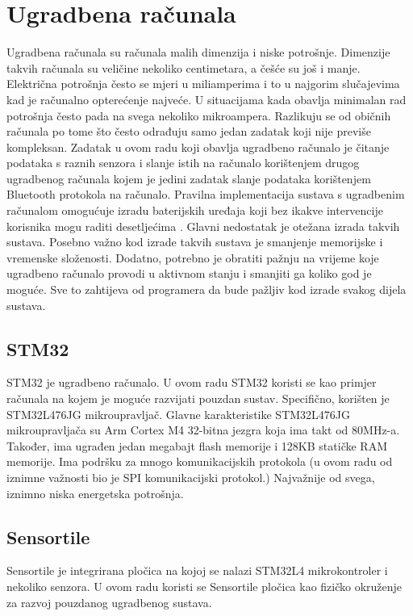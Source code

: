 \documentclass[times, utf8, diplomski]{diplomski}
\begin{document}
\chapter{Ugradbena računala}
Ugradbena računala su računala malih dimenzija i niske potrošnje. Dimenzije takvih računala su veličine nekoliko centimetara, a češće su još i manje.
Električna potrošnja često se mjeri u miliamperima i to u najgorim slučajevima kad je računalno opterećenje najveće.
U situacijama kada obavlja minimalan rad potrošnja često pada na svega nekoliko mikroampera.
Razlikuju se od običnih računala po tome što često odrađuju samo jedan zadatak koji nije previše kompleksan.
Zadatak u ovom radu koji obavlja ugradbeno računalo je čitanje podataka s raznih senzora i slanje istih na računalo korištenjem drugog ugradbenog
računala kojem je jedini zadatak slanje podataka korištenjem Bluetooth protokola na računalo.
Pravilna implementacija sustava s ugradbenim računalom omogućuje izradu baterijskih uređaja koji bez ikakve intervencije korisnika mogu raditi desetljećima \cite{holosys}. 
Glavni nedostatak je otežana izrada takvih sustava. Posebno važno kod izrade takvih sustava je smanjenje memorijske i vremenske složenosti.
Dodatno, potrebno je obratiti pažnju na vrijeme koje ugradbeno računalo provodi u aktivnom stanju i smanjiti ga koliko god je moguće.
Sve to zahtijeva od programera da bude pažljiv kod izrade svakog dijela sustava.


\section{STM32}
STM32 \cite{STM32L476JG} je ugradbeno računalo. U ovom radu STM32 koristi se kao primjer računala na kojem je moguće razvijati pouzdan sustav.
Specifično, korišten je STM32L476JG mikroupravljač.
Glavne karakteristike STM32L476JG mikroupravljača su Arm Cortex M4 32-bitna jezgra koja ima takt od 80MHz-a.
Također, ima ugrađen jedan megabajt flash memorije i 128KB statičke RAM memorije.
Ima podršku za mnogo komunikacijskih protokola (u ovom radu od iznimne važnosti bio je SPI komunikacijski protokol.)
Najvažnije od svega, iznimno niska energetska potrošnja.

\section{Sensortile}
Sensortile \cite{sensortile} je integrirana pločica na kojoj se nalazi STM32L4 mikrokontroler i nekoliko senzora. U ovom radu koristi se Sensortile pločica kao fizičko okruženje za razvoj pouzdanog ugradbenog sustava.
 
\end{document}
